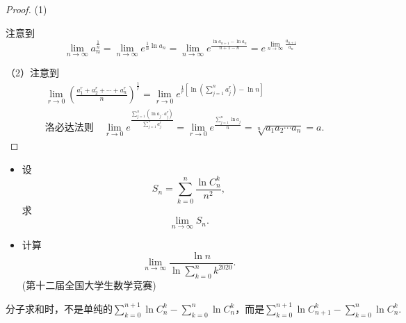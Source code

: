 \documentclass[lang=cn,10pt,thmcnt=section]{elegantbook}
\begin{document}
	\begin{proof}
		(1) 

		注意到$$
			\lim_{n \to \infty}a_n^{\frac{1}{n}}=\lim_{n \to \infty} e^{\frac{1}{n}\ln a_n}=\lim_{n \to \infty} e^{\frac{\ln a_{n+1}-\ln a_n}{n+1-n}}=e^{\lim_{n \to \infty} \frac{a_{n+1}}{a_n}}
		$$

		（2）注意到
		\begin{align*}
			&\lim_{r \to 0} \left( \frac{a_1^r + a_2^r + \cdots + a_n^r}{n} \right)^{\frac{1}{r}} = \lim_{r \to 0} e^{\frac{1}{r} \left[ \ln \left( \sum_{j=1}^n a_j^r \right) - \ln n \right] } \\
			&\text{洛必达法则} \quad \lim_{r \to 0} e^{\frac{\sum\limits_{j=1}^n (\ln a_j \cdot a_j^r)}{\sum\limits_{j=1}^n a_j^r}} = \lim_{r \to 0} e^{\frac{\sum\limits_{j=1}^n \ln a_j}{n}} = \sqrt[n]{a_1 a_2 \cdots a_n}=a.
			\end{align*}
	\end{proof}
\begin{example}
	\begin{itemize}
		\item 设  
		\[ S_n = \sum_{k=0}^n \frac{\ln C_n^k}{n^2}, \]  
		求  
		\[ \lim_{n \to \infty} S_n. \]
		
		\item 计算  
		\[ \lim_{n \to \infty} \frac{\ln n}{\ln \sum_{k=0}^n k^{2020}}. \]  
		(第十二届全国大学生数学竞赛)
	\end{itemize}
\end{example}
	\begin{remark}
		$\text{分子求和时，不是单纯的} \sum_{k=0}^{n+1} \ln C_n^k - \sum_{k=0}^n \ln C_n^k \text{，而是} \sum_{k=0}^{n+1} \ln C_{n+1}^k - \sum_{k=0}^n \ln C_n^k.$
\end{remark}
\end{document}
